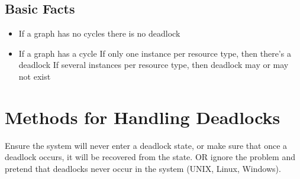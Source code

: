 \documentclass[oneside]{book}
\begin{document}
            \subsection{Basic Facts}
                \begin{itemize}
                    \item If a graph has no cycles there is no deadlock
                    \item If a graph has a cycle
                        \subitem If only one instance per resource type, then there's a deadlock
                        \subitem If several instances per resource type, then deadlock may or may not exist
                \end{itemize}
        \section{Methods for Handling Deadlocks}
            Ensure the system will never enter a deadlock state, or make sure that once a deadlock occurs,
            it will be recovered from the state. OR ignore the problem and pretend that deadlocks never occur
            in the system (UNIX, Linux, Windows).\\
\end{document}
